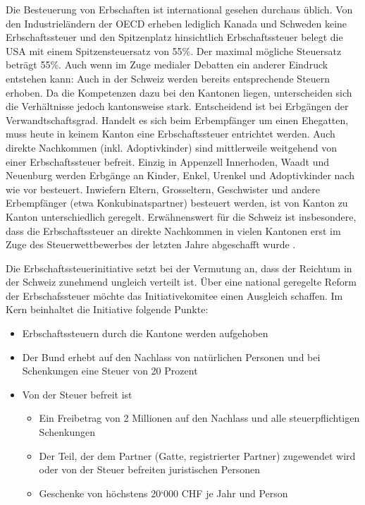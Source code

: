 \documentclass[a4paper, 12pt,liststotoc]{scrartcl}
\numberwithin{equation}{section}
\begin{document}
Die Besteuerung von Erbschaften ist international gesehen durchaus
üblich. Von den Industrieländern der OECD erheben lediglich Kanada und
Schweden keine Erbschaftssteuer und den Spitzenplatz hinsichtlich
Erbschaftssteuer belegt die USA mit einem Spitzensteuersatz von 55\%. Der maximal mögliche Steuersatz beträgt
55\%. Auch wenn im Zuge medialer Debatten ein anderer Eindruck entstehen
kann: Auch in der Schweiz werden bereits entsprechende Steuern erhoben.
Da die Kompetenzen dazu bei den Kantonen liegen, unterscheiden sich die
Verhältnisse jedoch kantonsweise stark. Entscheidend ist bei Erbgängen
der Verwandtschaftsgrad. Handelt es sich beim Erbempfänger um einen
Ehegatten, muss heute in keinem Kanton eine Erbschaftssteuer entrichtet
werden. Auch direkte Nachkommen (inkl. Adoptivkinder) sind mittlerweile
weitgehend von einer Erbschaftssteuer befreit. Einzig in Appenzell
Innerhoden, Waadt und Neuenburg werden Erbgänge an Kinder, Enkel,
Urenkel und Adoptivkinder nach wie vor besteuert. Inwiefern Eltern,
Grosseltern, Geschwister und andere Erbempfänger (etwa
Konkubinatspartner) besteuert werden, ist von Kanton zu Kanton
unterschiedlich geregelt. Erwähnenswert für die Schweiz ist
insbesondere, dass die Erbschaftssteuer an direkte Nachkommen in vielen
Kantonen erst im Zuge des Steuerwettbewerbes der letzten Jahre
abgeschafft wurde \parencite{estv2013}.

Die Erbschaftssteuerinitiative setzt bei der Vermutung an, dass der
Reichtum in der Schweiz zunehmend ungleich verteilt ist. Über eine
national geregelte Reform der Erbschafssteuer möchte das
Initiativekomitee einen Ausgleich schaffen. Im Kern beinhaltet die
Initiative folgende Punkte:

\begin{itemize}
\item
  Erbschaftssteuern durch die Kantone werden aufgehoben
\item
  Der Bund erhebt auf den Nachlass von natürlichen Personen und bei
  Schenkungen eine Steuer von 20 Prozent
\item
  Von der Steuer befreit ist

  \begin{itemize}
  \item
    Ein Freibetrag von 2 Millionen auf den Nachlass und alle
    steuerpflichtigen Schenkungen
  \item
    Der Teil, der dem Partner (Gatte, registrierter Partner) zugewendet
    wird oder von der Steuer befreiten juristischen Personen
  \item
    Geschenke von höchstens 20`000 CHF je Jahr und Person
  \end{itemize}
\end{itemize}
\end{document}
